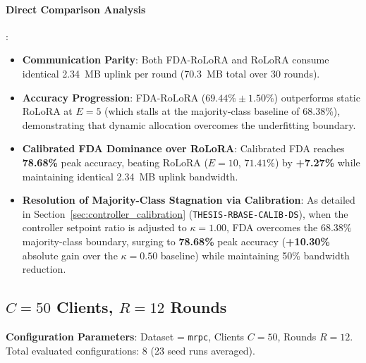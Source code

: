\documentclass[10pt,a4paper]{article}
\begin{document}
\paragraph{Direct Comparison Analysis}:
\begin{itemize}
    \item \textbf{Communication Parity}: Both FDA-RoLoRA and RoLoRA consume identical 2.34~MB uplink per round (70.3~MB total over 30 rounds).
    \item \textbf{Accuracy Progression}: FDA-RoLoRA ($69.44\% \pm 1.50\%$) outperforms static RoLoRA at $E=5$ (which stalls at the majority-class baseline of 68.38\%), demonstrating that dynamic allocation overcomes the underfitting boundary.
    \item \textbf{Calibrated FDA Dominance over RoLoRA}: Calibrated FDA reaches \textbf{78.68\%} peak accuracy, beating RoLoRA ($E=10$, $71.41\%$) by \textbf{+7.27\%} while maintaining identical 2.34~MB uplink bandwidth.
    \item \textbf{Resolution of Majority-Class Stagnation via Calibration}: As detailed in Section~\ref{sec:controller_calibration} (\texttt{THESIS-RBASE-CALIB-DS}), when the controller setpoint ratio is adjusted to $\kappa=1.00$, FDA overcomes the $68.38\%$ majority-class boundary, surging to \textbf{78.68\%} peak accuracy (\textbf{+10.30\%} absolute gain over the $\kappa=0.50$ baseline) while maintaining 50\% bandwidth reduction.
\end{itemize}


\clearpage
\subsection{\texorpdfstring{$C=50$ Clients, $R=12$ Rounds}{C=50 Clients, R=12 Rounds}}

\textbf{Configuration Parameters}: Dataset = \texttt{mrpc}, Clients $C = 50$, Rounds $R = 12$. Total evaluated configurations: 8 (23 seed runs averaged).
\end{document}
